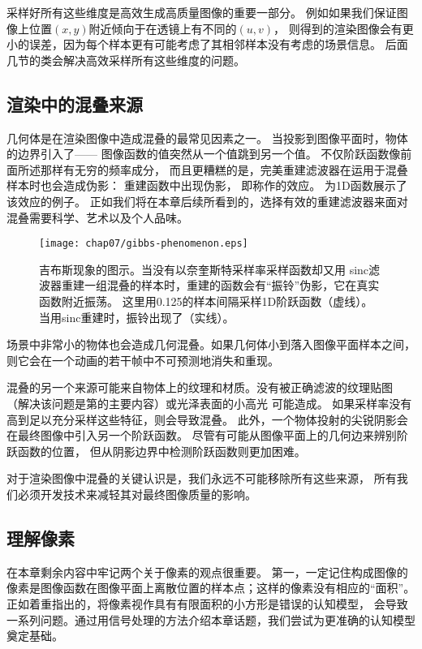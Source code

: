 采样好所有这些维度是高效生成高质量图像的重要一部分。
例如如果我们保证图像上位置$(x,y)$附近倾向于在透镜上有不同的$(u,v)$，
则得到的渲染图像会有更小的误差，因为每个样本更有可能考虑了其相邻样本没有考虑的场景信息。
后面几节的类会解决高效采样所有这些维度的问题。

\subsection{渲染中的混叠来源}\label{sub:渲染中的混叠来源}
几何体是在渲染图像中造成混叠的最常见因素之一。
当投影到图像平面时，物体的边界引入了——
图像函数的值突然从一个值跳到另一个值。
不仅阶跃函数像前面所述那样有无穷的频率成分，
而且更糟糕的是，完美重建滤波器在运用于混叠样本时也会造成伪影：
重建函数中出现伪影，
即称作的效应。
为1D函数展示了该效应的例子。
正如我们将在本章后续所看到的，选择有效的重建滤波器来面对混叠需要科学、艺术以及个人品味。
\begin{figure}[htbp]
    \centering\texttt{[image: chap07/gibbs-phenomenon.eps]}
    \caption{吉布斯现象的图示。当没有以奈奎斯特采样率采样函数却又用
        sinc滤波器重建一组混叠的样本时，重建的函数会有“振铃”伪影，它在真实函数附近振荡。
        这里用0.125的样本间隔采样1D阶跃函数（虚线）。当用sinc重建时，振铃出现了（实线）。}
    \label{fig:7.11}
\end{figure}

场景中非常小的物体也会造成几何混叠。如果几何体小到落入图像平面样本之间，
则它会在一个动画的若干帧中不可预测地消失和重现。

混叠的另一个来源可能来自物体上的纹理和材质。没有被正确滤波的纹理贴图
（解决该问题是第的主要内容）或光泽表面的小高光
可能造成。
如果采样率没有高到足以充分采样这些特征，则会导致混叠。
此外，一个物体投射的尖锐阴影会在最终图像中引入另一个阶跃函数。
尽管有可能从图像平面上的几何边来辨别阶跃函数的位置，
但从阴影边界中检测阶跃函数则更加困难。

对于渲染图像中混叠的关键认识是，我们永远不可能移除所有这些来源，
所有我们必须开发技术来减轻其对最终图像质量的影响。

\subsection{理解像素}\label{sub:理解像素}
在本章剩余内容中牢记两个关于像素的观点很重要。
第一，一定记住构成图像的像素是图像函数在图像平面上离散位置的样本点；这样的像素没有相应的“面积”。
正如\citet{Smith95apixel}着重指出的，将像素视作具有有限面积的小方形是错误的认知模型，
会导致一系列问题。通过用信号处理的方法介绍本章话题，我们尝试为更准确的认知模型奠定基础。

